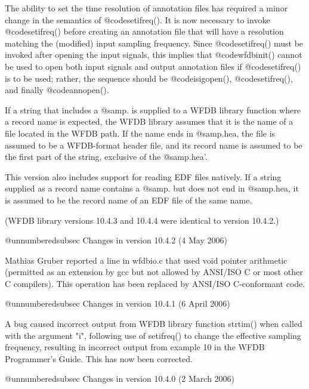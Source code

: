 {{{{{{{{The ability to set the time resolution of annotation files has required
a minor change in the semantics of @code{setifreq()}.  It is now necessary
to invoke @code{setifreq()} before creating an annotation file that will
have a resolution matching the (modified) input sampling frequency.
Since @code{setifreq()} must be invoked after opening the input signals,
this implies that @code{wfdbinit()} cannot be used to open both input signals
and output annotation files if @code{setifreq()} is to be used;  rather, the
sequence should be @code{isigopen()}, @code{setifreq()}, and finally
@code{annopen()}.

If a string that includes a @samp{.} is supplied to a WFDB library function
where a record name is expected, the WFDB library assumes that it is
the name of a file located in the WFDB path. If the name ends in @samp{.hea},
the file is assumed to be a WFDB-format header file, and its record name
is assumed to be the first part of the string, exclusive of the @samp{.hea'}.

This version also includes support for reading EDF files natively.
If a string supplied as a record name contains a @samp{.} but does not end
in @samp{.hea}, it is assumed to be the record name of an EDF file of the
same name.

(WFDB library versions 10.4.3 and 10.4.4 were identical to version 10.4.2.)

@unnumberedsubsec Changes in version 10.4.2 (4 May 2006)

Mathias Gruber reported a line in wfdbio.c that used void pointer arithmetic
(permitted as an extension by gcc but not allowed by ANSI/ISO C or most other C
compilers).  This operation has been replaced by ANSI/ISO C-conformant code.

@unnumberedsubsec Changes in version 10.4.1 (6 April 2006)

A bug caused incorrect output from WFDB library function strtim() when called
with the argument "i", following use of setifreq() to change the effective
sampling frequency, resulting in incorrect output from example 10 in the WFDB
Programmer's Guide.  This has now been corrected.

@unnumberedsubsec Changes in version 10.4.0 (2 March 2006)

}}}}}}}}
